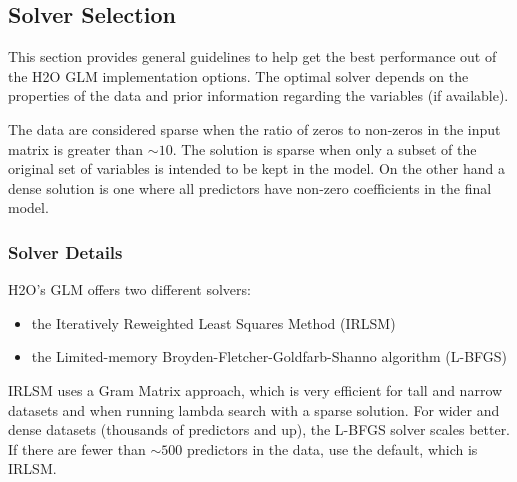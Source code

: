 \subsection{Solver Selection}

This section provides general guidelines to help get the best performance out of the H2O GLM implementation options. The optimal solver depends on the properties of the data and prior information regarding the variables (if available). 

The data are considered sparse when the ratio of zeros to non-zeros in the input matrix is greater than $\sim 10$. The solution is sparse when only a subset of the original set of variables is intended to be kept in the model. On the other hand a dense solution is one where all predictors have non-zero coefficients in the final model.

\subsubsection{Solver Details}

H2O's GLM offers two different solvers: 

\begin{itemize}
\item the Iteratively Reweighted Least Squares Method (IRLSM)
\item the Limited-memory Broyden-Fletcher-Goldfarb-Shanno algorithm (L-BFGS)
\end{itemize}
IRLSM uses
a Gram Matrix approach, which is very efficient for tall and narrow datasets and when running lambda search with a sparse solution.  For wider and dense
datasets (thousands of predictors and up), the L-BFGS solver scales better. If there are fewer than $\sim 500$ predictors in the data, use the default, which is IRLSM. 

